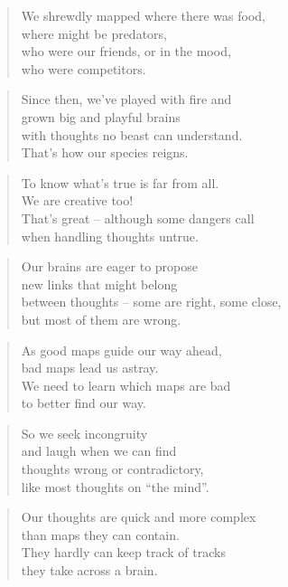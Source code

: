 \documentclass[14pt,a4paper]{article}
\begin{document}
\begin{verse}
We shrewdly mapped where there was food,\\
where might be predators,\\
who were our friends, or in the mood,\\
who were competitors.
\end{verse}

\begin{verse}
Since then, we’ve played with fire and\\
grown big and playful brains\\
with thoughts no beast can understand.\\
That’s how our species reigns.
\end{verse}

\begin{verse}
To know what’s true is far from all.\\
We are creative too!\\
That’s great – although some dangers call\\
when handling thoughts untrue.
\end{verse}

\begin{verse}
Our brains are eager to propose\\
new links that might belong\\
between thoughts – some are right, some close,\\
but most of them are wrong.
\end{verse}

\begin{verse}
As good maps guide our way ahead,\\
bad maps lead us astray.\\
We need to learn which maps are bad\\
to better find our way.
\end{verse}

\begin{verse}
So we seek incongruity\\
and laugh when we can find\\
thoughts wrong or contradictory,\\
like most thoughts on “the mind”.
\end{verse}

\begin{verse}
Our thoughts are quick and more complex\\
than maps they can contain.\\
They hardly can keep track of tracks\\
they take across a brain.
\end{verse}
\end{document}
